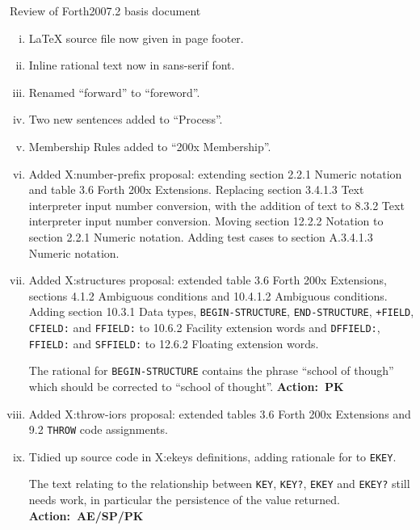 \documentclass{article}
\makeatletter
\newcommand{\action}[1]{%
	\mbox{}\hfill \textbf{Action:~#1}%
}
\newcommand{\word}[1]{\texttt{#1}}
\renewcommand{\section}{\@startsection
	{section}{1}{0pt}{1pt}{1pt}
	{\normalfont\bfseries}
}
\makeatother
\begin{document}
\section{Review of Forth2007.2 basis document}
\label{review}
	\begin{enumerate}[i)]
	\item \LaTeX{} source file now given in page footer.

	\item Inline rational text now in sans-serif font.

	\item Renamed ``forward'' to ``foreword''.

	\item Two new sentences added to ``Process''.

	\item Membership Rules added to ``200x Membership''.

	\item Added \textsf{X:number-prefix} proposal:
		extending section 2.2.1 Numeric notation and table 3.6 Forth 200x
		Extensions. Replacing section 3.4.1.3 Text interpreter input number
		conversion, with the addition of text to 8.3.2 Text interpreter input
		number conversion.  Moving section 12.2.2 Notation to section 2.2.1
		Numeric notation.  Adding test cases to section A.3.4.1.3 Numeric
		notation.

	\item Added \textsf{X:structures} proposal:
		extended table 3.6 Forth 200x Extensions, sections 4.1.2 Ambiguous
		conditions and 10.4.1.2 Ambiguous conditions.
		Adding section 10.3.1 Data types,
		\word{BEGIN-STRUCTURE}, \word{END-STRUCTURE}, \word{+FIELD},
		\word{CFIELD:} and \word{FFIELD:} to 10.6.2 Facility extension words
		and \word{DFFIELD:}, \word{FFIELD:} and \word{SFFIELD:} to 12.6.2
		Floating extension words.

		The rational for \word{BEGIN-STRUCTURE} contains the phrase
		``school of though'' which should be corrected to ``school of
		thought''.
		\action{PK}

	\item Added \textsf{X:throw-iors} proposal:
		extended tables 3.6 Forth 200x Extensions and 9.2 \word{THROW}
		code assignments.

	\item Tidied up source code in \textsf{X:ekeys} definitions, adding
		rationale for to \word{EKEY}.

		The text relating to the relationship between \word{KEY}, \word{KEY?},
		\word{EKEY} and \word{EKEY?} still needs work, in particular the
		persistence of the value returned.
		\action{AE/SP/PK}


\end{enumerate}
\end{document}

